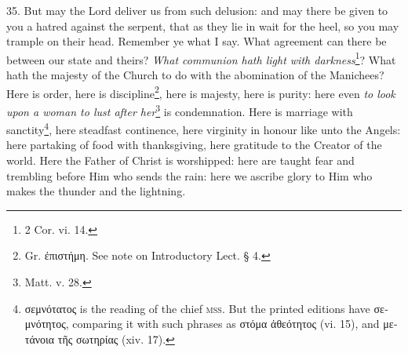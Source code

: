 35. But may the Lord deliver us from such delusion: and may there be given to you a hatred against the serpent, that as they lie in wait for the heel, so you may trample on their head. Remember ye what I say. What agreement can there be between our state and theirs? \emph{What communion hath light with darkness}\footnote{2 Cor. vi. 14.}? What hath the majesty of the Church to do with the abomination of the Manichees? Here is order, here is discipline\footnote{Gr. \textgreek{ἐπιστήμη}. See note on Introductory Lect. § 4.}, here is majesty, here is purity: here even \emph{to look upon a woman to lust after her}\footnote{Matt. v. 28.} is condemnation. Here is marriage with sanctity\footnote{\textgreek{σεμνότατος} is the reading of the chief \textsc{mss.} But the printed editions have \textgreek{σεμνότητος}, comparing it with such phrases as \textgreek{στόμα ἀθεότητος} (vi. 15), and \textgreek{μετάνοια τῆς σωτηρίας} (xiv. 17).}, here steadfast continence, here virginity in honour like unto the Angels: here partaking of food with thanksgiving, here gratitude to the Creator of the world. Here the Father of Christ is worshipped: here are taught fear and trembling before Him who sends the rain: here we ascribe glory to Him who makes the thunder and the lightning.

